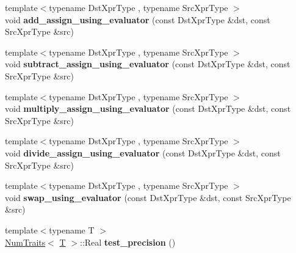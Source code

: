 \begin{DoxyCompactItemize}
\mbox{\label{namespace_eigen_ae38f2d7c7e914818e584561f5888123a}} 
{\footnotesize template$<$typename Dst\+Xpr\+Type , typename Src\+Xpr\+Type $>$ }\\void {\bfseries add\+\_\+assign\+\_\+using\+\_\+evaluator} (const Dst\+Xpr\+Type \&dst, const Src\+Xpr\+Type \&src)
\item 
\mbox{\label{namespace_eigen_a5e181f2c102982e79cd3f58f7b013cd8}} 
{\footnotesize template$<$typename Dst\+Xpr\+Type , typename Src\+Xpr\+Type $>$ }\\void {\bfseries subtract\+\_\+assign\+\_\+using\+\_\+evaluator} (const Dst\+Xpr\+Type \&dst, const Src\+Xpr\+Type \&src)
\item 
\mbox{\label{namespace_eigen_a94ef6eff082c409d877105430d7837ec}} 
{\footnotesize template$<$typename Dst\+Xpr\+Type , typename Src\+Xpr\+Type $>$ }\\void {\bfseries multiply\+\_\+assign\+\_\+using\+\_\+evaluator} (const Dst\+Xpr\+Type \&dst, const Src\+Xpr\+Type \&src)
\item 
\mbox{\label{namespace_eigen_ab07a8b514d9e4239d18f822ae16512bc}} 
{\footnotesize template$<$typename Dst\+Xpr\+Type , typename Src\+Xpr\+Type $>$ }\\void {\bfseries divide\+\_\+assign\+\_\+using\+\_\+evaluator} (const Dst\+Xpr\+Type \&dst, const Src\+Xpr\+Type \&src)
\item 
\mbox{\label{namespace_eigen_a6579967d42a614cebe40909ec8a4054f}} 
{\footnotesize template$<$typename Dst\+Xpr\+Type , typename Src\+Xpr\+Type $>$ }\\void {\bfseries swap\+\_\+using\+\_\+evaluator} (const Dst\+Xpr\+Type \&dst, const Src\+Xpr\+Type \&src)
\item 
\mbox{\label{namespace_eigen_a59fa1c0c2d234197bce8d461a4776793}} 
{\footnotesize template$<$typename T $>$ }\\\hyperlink{group___core___module_struct_eigen_1_1_num_traits}{Num\+Traits}$<$ \hyperlink{group___sparse_core___module}{T} $>$\+::Real {\bfseries test\+\_\+precision} ()
\item 
\mbox{\label{namespace_eigen_a6881d7a18f97c01df6c1252fc5bac126}} 

\end{DoxyCompactItemize}
